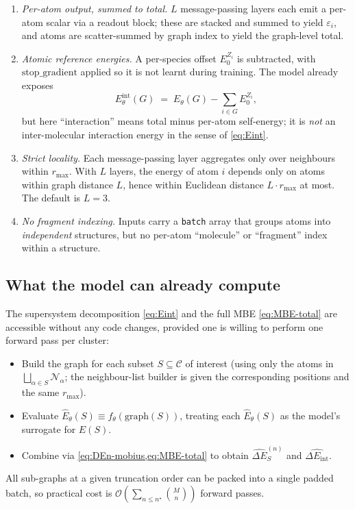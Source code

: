 \documentclass[11pt,a4paper]{article}
\newcommand{\Eint}{\Delta E_{\mathrm{int}}}
\newcommand{\rmax}{r_{\mathrm{max}}}
\begin{document}
\begin{enumerate}[leftmargin=1.6em]
\item \emph{Per-atom output, summed to total.} $L$ message-passing layers each
emit a per-atom scalar via a readout block; these are stacked and summed to
yield $\varepsilon_i$, and atoms are scatter-summed by graph index to yield the
graph-level total.

\item \emph{Atomic reference energies.} A per-species offset $E_0^{Z_i}$ is
subtracted, with $\mathrm{stop\_gradient}$ applied so it is not learnt during
training. The model already exposes
\[
E_\theta^{\mathrm{int}}(G) \;=\; E_\theta(G) - \sum_{i \in G} E_0^{Z_i},
\]
but here ``interaction'' means total minus per-atom self-energy; it is
\emph{not} an inter-molecular interaction energy in the sense of
\cref{eq:Eint}.

\item \emph{Strict locality.} Each message-passing layer aggregates only over
neighbours within $\rmax$. With $L$ layers, the energy of atom $i$ depends only
on atoms within graph distance $L$, hence within Euclidean distance
$L \cdot \rmax$ at most. The default is $L = 3$.

\item \emph{No fragment indexing.} Inputs carry a \texttt{batch} array that
groups atoms into \emph{independent} structures, but no per-atom
``molecule'' or ``fragment'' index within a structure.
\end{enumerate}

\subsection{What the model can already compute}

The supersystem decomposition \cref{eq:Eint} and the full MBE \cref{eq:MBE-total}
are accessible without any code changes, provided one is willing to perform one
forward pass per cluster:

\begin{itemize}[leftmargin=1.4em]
\item Build the graph for each subset $S \subseteq \mathcal{C}$ of interest
(using only the atoms in $\bigsqcup_{\alpha \in S} \mathcal{N}_\alpha$;
the neighbour-list builder is given the corresponding positions and the same
$\rmax$).
\item Evaluate $\hat E_\theta(S) \equiv f_\theta(\text{graph}(S))$, treating
each $\hat E_\theta(S)$ as the model's surrogate for $E(S)$.
\item Combine via \cref{eq:DEn-mobius,eq:MBE-total} to obtain
$\widehat{\Delta E}^{(n)}_{S}$ and $\widehat{\Eint}$.
\end{itemize}
All sub-graphs at a given truncation order can be packed into a single padded
batch, so practical cost is $\mathcal{O}(\sum_{n \le n^\star} \binom{M}{n})$
forward passes.
\end{document}

